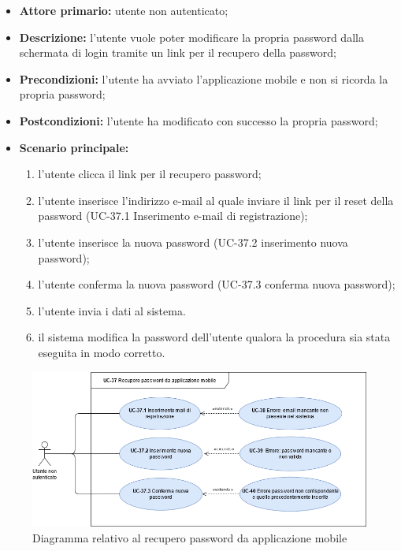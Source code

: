 	\begin{itemize}
		\item \textbf{Attore primario:} utente non autenticato;

		\item \textbf{Descrizione:} l'utente vuole poter modificare la propria password dalla schermata di login tramite un link per il recupero della password;

		\item \textbf{Precondizioni:} l'utente ha avviato l'applicazione mobile e non si ricorda la propria password;

		\item \textbf{Postcondizioni:} l'utente ha modificato con successo la propria password;

		\item \textbf{Scenario principale:}
	  		\begin{enumerate}
		  		\item l'utente clicca il link per il recupero password; 
		  		\item l'utente inserisce l'indirizzo e-mail al quale inviare il link per il reset della password (UC-37.1 Inserimento e-mail di registrazione);
		  		\item l'utente inserisce la nuova password (UC-37.2 inserimento nuova password);
		  		\item l'utente conferma la nuova password (UC-37.3 conferma nuova password);
		  		\item l'utente invia i dati al sistema.
		  		\item il sistema modifica la password dell'utente qualora la procedura sia stata eseguita in modo corretto.
	  		\end{enumerate}
	\end{itemize}

	\begin{figure}[H]
		\centering
		  \includegraphics[scale=0.50]{src/CasiDUso/immagini/RecuperoPasswordMobile.png}
		\caption{Diagramma relativo al recupero password da applicazione mobile}
	\end{figure}


